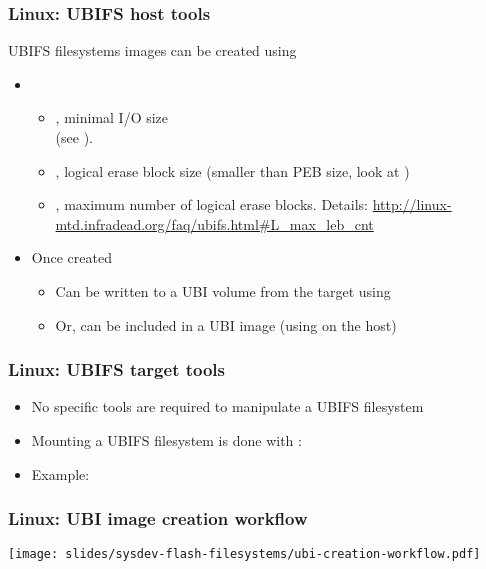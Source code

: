 \begin{frame}
  \frametitle{Linux: UBIFS host tools}
  UBIFS filesystems images can be created using 
    \begin{itemize}
    \item {}
      \begin{itemize}
      \item {}, minimal I/O size\\
                 (see ).
      \item {}, logical erase block size (smaller than
                 PEB size, look at )
      \item {}, maximum number of logical erase
        blocks. Details:
        {\tiny\url{http://linux-mtd.infradead.org/faq/ubifs.html\#L_max_leb_cnt}}
      \end{itemize}
    \item Once created
      \begin{itemize}
      \item Can be written to a UBI volume from the target using
      \item Or, can be included in a UBI image (using 
        on the host)
      \end{itemize}
    \end{itemize}
\end{frame}

\begin{frame}
  \frametitle{Linux: UBIFS target tools}
  \begin{itemize}
  \item No specific tools are required to manipulate a UBIFS filesystem
  \item Mounting a UBIFS filesystem is done with :\\
  \item Example:\\
  \end{itemize}
\end{frame}

\begin{frame}
  \frametitle{Linux: UBI image creation workflow}
  \begin{center}
    \texttt{[image: slides/sysdev-flash-filesystems/ubi-creation-workflow.pdf]}
  \end{center}
\end{frame}

